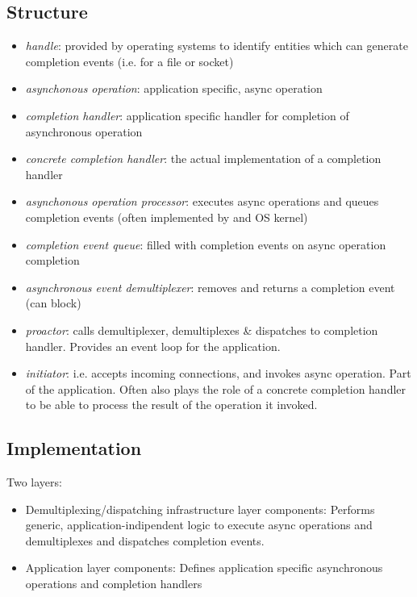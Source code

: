 \subsection{Structure}

\begin{itemize}
	\item \emph{handle}: provided by operating systems to identify entities which can generate completion events (i.e. for a file or socket)
	\item \emph{asynchonous operation}: application specific, async operation
	\item \emph{completion handler}: application specific handler for completion of asynchronous operation
	\item \emph{concrete completion handler}: the actual implementation of a completion handler
	\item \emph{asynchonous operation processor}: executes async operations and queues completion events (often implemented by and OS kernel)
	\item \emph{completion event queue}: filled with completion events on async operation completion
	\item \emph{asynchronous event demultiplexer}: removes and returns a completion event (can block)
	\item \emph{proactor}: calls demultiplexer, demultiplexes \& dispatches to completion handler. Provides an event loop for the application.
	\item \emph{initiator}: i.e. accepts incoming connections, and invokes async operation. Part of the application. Often also plays the role of a concrete completion handler to be able to process the result of the operation it invoked.
\end{itemize}


\subsection{Implementation}

Two layers:
\begin{itemize}
	\item Demultiplexing/dispatching infrastructure layer components: Performs generic, application-indipendent logic to execute async operations and demultiplexes and dispatches completion events.
	\item Application layer components: Defines application specific asynchronous operations and completion handlers
\end{itemize}

